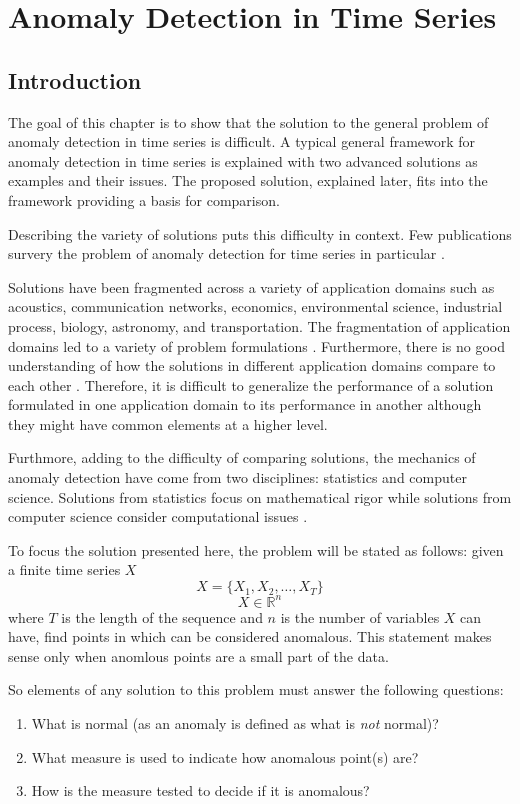 

\chapter[Anomaly Detection in Time Series]{Anomaly Detection in Time Series}

\section[Introduction]{Introduction}

The goal of this chapter is to show that the solution to the general problem of anomaly detection in time series is difficult. A typical general framework for anomaly detection in time series is explained with two advanced solutions as examples and their issues. The proposed solution, explained later, fits into the framework providing a basis for comparison.

Describing the variety of solutions puts this difficulty in context. Few publications survery the problem of anomaly detection for time series in particular \cite{Cheboli2010} \cite{Gupta2013}.

Solutions have been fragmented across a variety of application domains such as acoustics, communication networks, economics, environmental science, industrial process, biology, astronomy, and transportation. The fragmentation of application domains led to a variety of problem formulations \cite{Gupta2013}. Furthermore, there is no good understanding of how the solutions in different application domains compare to each other \cite{Cheboli2010}. Therefore, it is difficult to generalize the performance of a solution formulated in one application domain to its performance in another although they might have common elements at a higher level.

Furthmore, adding to the difficulty of comparing solutions, the mechanics of anomaly detection have come from two disciplines: statistics and computer science. Solutions from statistics focus on mathematical rigor while solutions from computer science consider computational issues \cite{Gupta2013}.

To focus the solution presented here, the problem will be stated as follows: given a finite time series $X$
 \[ X=\{X_1,X_2,\ldots,X_T\}\]
\[  X \in \mathbb{R}^n \]
where $T$ is the length of the sequence and $n$ is the number of variables $X$ can have, find points in which can be considered anomalous. This statement makes sense only when anomlous points are a small part of the data.

So elements of any solution to this problem must answer the following questions:

\begin{enumerate}
\item
What is normal (as an anomaly is defined as what is \textit{not} normal)?
\item
What measure is used to indicate how anomalous point(s) are?
\item
How is the measure tested to decide if it is anomalous?
\end{enumerate}

